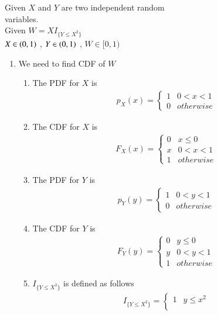 





Given $X$ and $Y$ are two independent random\\
variables. \\
Given $W=XI_{\{Y\leq X^2\}}$ \\
$X \in \left(0,1\right)$ , $Y \in \left(0,1\right)$ , $W \in [0,1)$\\
\begin{enumerate}
\item We need to find CDF of $W$
\begin{enumerate}
\item The PDF for $X$ is
\begin{align}
p_X(x) = 
\begin{cases}
     1 & 0 < x  < 1 \\
     0 & otherwise 
\end{cases}\label{june2013-70:1}
\end{align}
\item The CDF for $X$ is
\begin{align}
F_{X}(x)  = 
\begin{cases}
      0 & x \leq 0 \\
      x & 0 < x < 1 \\
      1 & otherwise
\end{cases}  \label{june2013-70:eq:2}
\end{align}
\item The PDF for $Y$ is
\begin{align}
p_{Y}(y)  = 
\begin{cases}
      1 & 0 < y < 1 \\
      0 & otherwise 
\end{cases} \label{june2013-70:3}
\end{align}
\item The CDF for $Y$ is
\begin{align}
F_{Y}(y)  = 
\begin{cases}
      0 & y \leq 0 \\
      y & 0 < y < 1 \\
      1 & otherwise 
\end{cases}\label{june2013-70:4}
\end{align}
\item $I_{\{Y\leq X^2\}}$ is defined as follows
\begin{align} 
I_{\{Y\leq X^2\}} =
\begin{cases}
    1 & y \leq x^2  \\

\end{cases}
\end{align}
\end{enumerate}
\end{enumerate}
